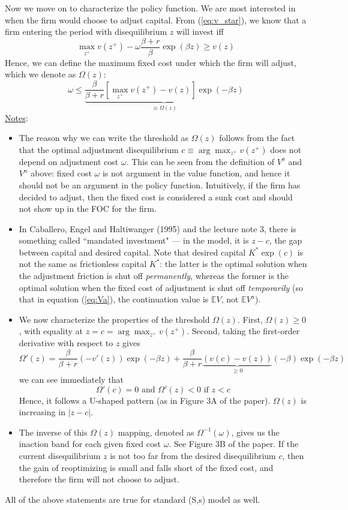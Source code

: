 \documentclass[12pt]{article}
\begin{document}
Now we move on to characterize the policy function. We are most interested in when the firm would choose to adjust capital. From (\ref{eq:v_star}), we know that a firm entering the period with disequilibrium $z$ will invest iff
\begin{equation} 
	\max_{z^+} v(z^+) - \omega \frac{\beta + r}{\beta} \exp(\beta z) \geq v(z)
\end{equation}
Hence, we can define the maximum fixed cost under which the firm will adjust, which we denote as $\Omega(z)$:
\begin{equation} \label{eq:range_omega}
	\omega \leq \underbrace{\frac{\beta}{\beta + r}\left[\max_{z^+} v(z^+) - v(z)\right] \exp(-\beta z)}_{\equiv \Omega(z)}
\end{equation}  
\underline{Notes}:
\begin{itemize}
	\item The reason why we can write the threshold as $\Omega(z)$ follows from the fact that the optimal adjustment disequilibrium $c \equiv \arg \max_{z^+} v(z^+)$ does not depend on adjustment cost $\omega$. This can be seen from the definition of $V^a$ and $V^n$ above: fixed cost $\omega$ is not argument in the value function, and hence it should not be an argument in the policy function. Intuitively, if the firm has decided to adjust, then the fixed cost is considered a sunk cost and should not show up in the FOC for the firm. 
	\item In Caballero, Engel and Haltiwanger (1995) and the lecture note 3, there is something called ``mandated investment" --- in the model, it is $z-c$, the gap between capital and desired capital. Note that desired capital $K^* \exp(c)$ is not the same as frictionless capital $K^*$: the latter is the optimal solution when the adjustment friction is shut off \textit{permanently}, whereas the former is the optimal solution when the fixed cost of adjustment is shut off \textit{temporarily} (so that in equation (\ref{eq:Va}), the continuation value is $\mathbb{E}V$, not $\mathbb{E}V^a$).
		\item We now characterize the properties of the threshold $\Omega(z)$. First, $\Omega(z) \geq 0$, with equality at $z = c = \arg \max_{z^+} v(z^+)$. Second, taking the first-order derivative with respect to $z$ gives
	\[\Omega'(z) = \frac{\beta}{\beta + r} (-v'(z)) \exp(-\beta z) + \frac{\beta}{\beta + r} \underbrace{(v(c) - v(z))}_{\geq 0} (-\beta) \exp(-\beta z)\]
	we can see immediately that
	\[\Omega'(c) = 0 \text{ and } \Omega'(z) < 0 \text{ if } z< c\]
		Hence, it follows a U-shaped pattern (as in Figure 3A of the paper). $\Omega(z)$ is increasing in $|z-c|$.
	\item The inverse of this $\Omega(z)$ mapping, denoted as $\Omega^{-1}(\omega)$, gives us the inaction band for each given fixed cost $\omega$. See Figure 3B of the paper. If the current disequilibrium $z$ is not too far from the desired disequilibrium $c$, then the gain of reoptimizing is small and falls short of the fixed cost, and therefore the firm will not choose to adjust. 
\end{itemize}
All of the above statements are true for standard (S,s) model as well.
\end{document}
